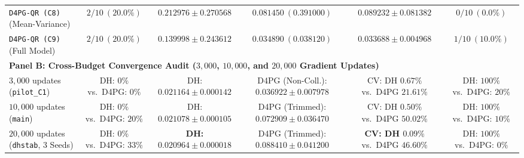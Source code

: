 \documentclass[11pt,a4paper]{article}
\begin{document}
\begin{table}[htbp]
{\begin{tabular}{lccccc}
    \texttt{D4PG-QR (C8)} (Mean-Variance) & $2/10\ (20.0\%)$ & $0.212976 \pm 0.270568$ & $0.081450\ (0.391000)$ & $0.089232 \pm 0.081382$ & $0/10\ (0.0\%)$ \\
    \texttt{D4PG-QR (C9)} (Full Model) & $2/10\ (20.0\%)$ & $0.139998 \pm 0.243612$ & $0.034890\ (0.038120)$ & $0.033688 \pm 0.004968$ & $1/10\ (10.0\%)$ \\
    \midrule
    \multicolumn{6}{l}{\textbf{Panel B: Cross-Budget Convergence Audit ($3,000$, $10,000$, and $20,000$ Gradient Updates)}} \\
    $3,000$ updates (\texttt{pilot\_C1}) & DH: $0\%$ vs.\ D4PG: $0\%$ & DH: $0.021164 \pm 0.000142$ & D4PG (Non-Coll.): $0.036922 \pm 0.007978$ & CV: DH $0.67\%$ vs.\ D4PG $21.61\%$ & DH: $100\%$ vs.\ D4PG: $20\%$ \\
    $10,000$ updates (\texttt{main}) & DH: $0\%$ vs.\ D4PG: $20\%$ & DH: $0.021078 \pm 0.000105$ & D4PG (Trimmed): $0.072909 \pm 0.036470$ & CV: DH $0.50\%$ vs.\ D4PG $50.02\%$ & DH: $100\%$ vs.\ D4PG: $10\%$ \\
    $20,000$ updates (\texttt{dhstab}, 3 Seeds) & DH: $0\%$ vs.\ D4PG: $33\%$ & \textbf{DH: $\mathbf{0.020964 \pm 0.000018}$} & D4PG (Trimmed): $0.088410 \pm 0.041200$ & \textbf{CV: DH $\mathbf{0.09\%}$} vs.\ D4PG $46.60\%$ & DH: $100\%$ vs.\ D4PG: $0\%$ \\
    \bottomrule
  \end{tabular}%
  }
\end{table}
\end{document}
